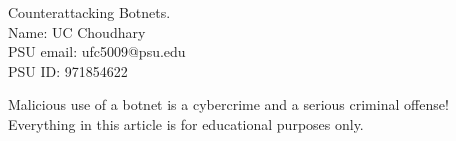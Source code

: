 \documentclass{article}
\newcommand{\titlefont}{\fontfamily{ppl}\selectfont}
\begin{document}
\begin{titlepage}
  \vspace*{160pt}
  \begin{center}
    {\titlefont \Huge Counterattacking Botnets.}\\[1cm]
    {\LARGE Name: UC Choudhary\\[1cm]}
    {\LARGE PSU email: ufc5009@psu.edu\\[1cm]}
    {\LARGE PSU ID: 971854622\\[1cm]}
  \end{center}
  \thispagestyle{fancy}
  \vspace*{\fill}
\end{titlepage}

\tableofcontents
\newpage

\begin{tcolorbox}[
  colback=backcolour,            %
  colframe=red!75!black,    %
  title={Disclaimer},
  fonttitle=\bfseries\large\centering,
  arc=4mm,                  %
  boxrule=1pt,              %
  left=10pt, right=10pt,    %
  top=10pt, bottom=10pt,    %
  enhanced
]
Malicious use of a botnet is a cybercrime and a serious criminal offense!
Everything in this article is for educational purposes only.
\end{tcolorbox}
\end{document}
